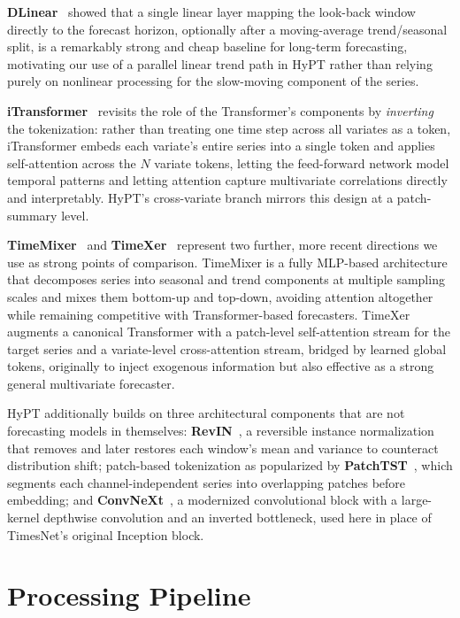 \documentclass[10pt,journal]{IEEEtran}
\begin{document}
\textbf{DLinear}~\cite{dlinear} showed that a single linear layer mapping the look-back window directly to the forecast horizon, optionally after a moving-average trend/seasonal split, is a remarkably strong and cheap baseline for long-term forecasting, motivating our use of a parallel linear trend path in HyPT rather than relying purely on nonlinear processing for the slow-moving component of the series.

\textbf{iTransformer}~\cite{itransformer} revisits the role of the Transformer's components by \emph{inverting} the tokenization: rather than treating one time step across all variates as a token, iTransformer embeds each variate's entire series into a single token and applies self-attention across the $N$ variate tokens, letting the feed-forward network model temporal patterns and letting attention capture multivariate correlations directly and interpretably. HyPT's cross-variate branch mirrors this design at a patch-summary level.

\textbf{TimeMixer}~\cite{timemixer} and \textbf{TimeXer}~\cite{timexer} represent two further, more recent directions we use as strong points of comparison. TimeMixer is a fully MLP-based architecture that decomposes series into seasonal and trend components at multiple sampling scales and mixes them bottom-up and top-down, avoiding attention altogether while remaining competitive with Transformer-based forecasters. TimeXer augments a canonical Transformer with a patch-level self-attention stream for the target series and a variate-level cross-attention stream, bridged by learned global tokens, originally to inject exogenous information but also effective as a strong general multivariate forecaster.

HyPT additionally builds on three architectural components that are not forecasting models in themselves: \textbf{RevIN}~\cite{revin}, a reversible instance normalization that removes and later restores each window's mean and variance to counteract distribution shift; patch-based tokenization as popularized by \textbf{PatchTST}~\cite{patchtst}, which segments each channel-independent series into overlapping patches before embedding; and \textbf{ConvNeXt}~\cite{convnext}, a modernized convolutional block with a large-kernel depthwise convolution and an inverted bottleneck, used here in place of TimesNet's original Inception block.

\section{Processing Pipeline}
\label{sec:pipeline}
\end{document}
